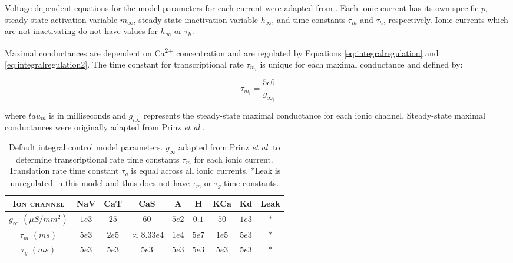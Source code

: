 Voltage-dependent equations for the model parameters for each current were adapted from \cite{prinz_alternative_2003}. Each ionic current has its own specific $p$, steady-state activation variable $m_\infty$, steady-state inactivation variable $h_\infty$, and time constants $\tau_m$ and $\tau_h$, respectively. Ionic currents which are not inactivating do not have values for $h_\infty$ or $\tau_h$.

Maximal conductances are dependent on Ca\textsuperscript{2+} concentration and are regulated by Equations \ref{eq:integralregulation} and \ref{eq:integralregulation2}. The time constant for transcriptional rate $\tau_{m_i}$ is unique for each maximal conductance and defined by:

\begin{equation}
    \tau_{m_i} = \frac{5e6}{g_{\infty_i}}
\end{equation}

where $tau_m$ is in milliseconds and $g_{i\infty}$ represents the steady-state maximal conductance for each ionic channel. Steady-state maximal conductances were originally adapted from Prinz \textit{et al.}\cite{prinz_alternative_2003}.

\begin{table}[H]
    \centering
    \begin{tabular}{ccccccccc}
        \textsc{Ion channel} & NaV & CaT & CaS & A & H & KCa & Kd & Leak \\
        \hline
    $g_\infty$ $(\mu S/mm^2)$ & $1e3$ & $25$ & $60$ & $5e2$ & $0.1$ & $50$ & $1e3$ & $*$ \\
        \hline
        $\tau_m$ $(ms)$ & $5e3$ & $2e5$ & $\approx 8.33e4$ & $1e4$ & $5e7$ & $1e5$ & $5e3$ & $*$ \\
        \hline
        $\tau_g$ $(ms)$ & $5e3$ & $5e3$ & $5e3$ & $5e3$ & $5e3$ & $5e3$ & $5e3$ & $*$
    \end{tabular}
    \caption[Integral control model parameters]{Default integral control model parameters. $g_\infty$ adapted from Prinz \textit{et al.} to determine transcriptional rate time constants $\tau_m$ for each ionic current\cite{prinz_alternative_2003}. Translation rate time constant $\tau_g$ is equal across all ionic currents. *Leak is unregulated in this model and thus does not have $\tau_m$ or $\tau_g$ time constants.}
    \label{tab:integralparameters}
\end{table}

